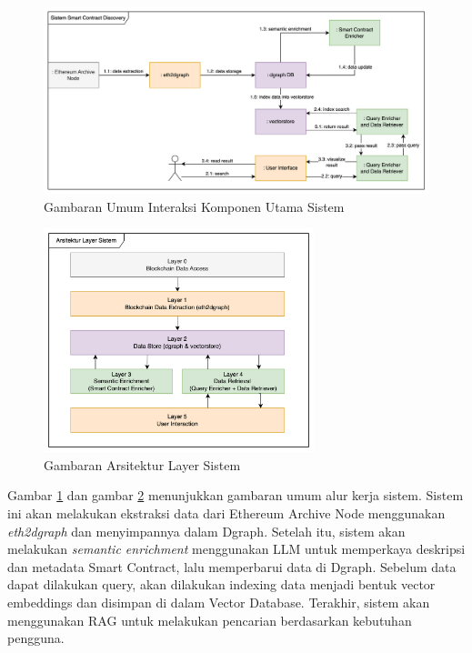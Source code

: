 \begin{figure}[ht]
	\centering
	\includegraphics[width=1\textwidth]{resources/chapter-3/komponen-utama-new.png}
	\caption{Gambaran Umum Interaksi Komponen Utama Sistem}
	\label{image:komponen-sistem}
\end{figure}

\begin{figure}[ht]
	\centering
	\includegraphics[width=0.7\textwidth]{resources/chapter-3/layer-arsitektur-new.png}
	\caption{Gambaran Arsitektur Layer Sistem}
	\label{image:layer-arsitektur}
\end{figure}


Gambar \ref{image:komponen-sistem} dan gambar \ref{image:layer-arsitektur} menunjukkan gambaran umum alur kerja sistem. Sistem ini akan melakukan ekstraksi data dari Ethereum Archive Node menggunakan \textit{eth2dgraph} dan menyimpannya dalam Dgraph. Setelah itu, sistem akan melakukan \textit{semantic enrichment} menggunakan LLM untuk memperkaya deskripsi dan metadata Smart Contract, lalu memperbarui data di Dgraph. Sebelum data dapat dilakukan query, akan dilakukan indexing data menjadi bentuk vector embeddings dan disimpan di dalam Vector Database. Terakhir, sistem akan menggunakan RAG untuk melakukan pencarian berdasarkan kebutuhan pengguna.

